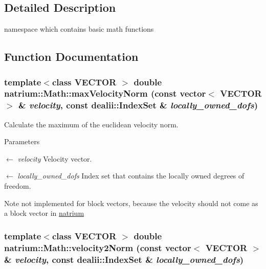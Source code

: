 \subsection{Detailed Description}
namespace which contains basic math functions 

\subsection{Function Documentation}
\hypertarget{namespacenatrium_1_1Math_afdfb0b93daae2db1221dc22e268c631d}{
\subsubsection[{maxVelocityNorm}]{\setlength{\rightskip}{0pt plus 5cm}template$<$class VECTOR $>$ double natrium::Math::maxVelocityNorm (const vector$<$ VECTOR $>$ \& {\em velocity}, \/  const dealii::IndexSet \& {\em locally\_\-owned\_\-dofs})}}
\label{namespacenatrium_1_1Math_afdfb0b93daae2db1221dc22e268c631d}


Calculate the maximum of the euclidean velocity norm. 
\begin{DoxyParams}{Parameters}
\item[\mbox{$\leftarrow$} {\em velocity}]Velocity vector. \item[\mbox{$\leftarrow$} {\em locally\_\-owned\_\-dofs}]Index set that contains the locally owned degrees of freedom. \end{DoxyParams}
\begin{DoxyNote}{Note}
not implemented for block vectors, because the velocity should not come as a block vector in \hyperlink{namespacenatrium}{natrium} 
\end{DoxyNote}
\hypertarget{namespacenatrium_1_1Math_ac6abc916cc66dda84a4e5c28e61be560}{
\subsubsection[{velocity2Norm}]{\setlength{\rightskip}{0pt plus 5cm}template$<$class VECTOR $>$ double natrium::Math::velocity2Norm (const vector$<$ VECTOR $>$ \& {\em velocity}, \/  const dealii::IndexSet \& {\em locally\_\-owned\_\-dofs})}}
\label{namespacenatrium_1_1Math_ac6abc916cc66dda84a4e5c28e61be560}


